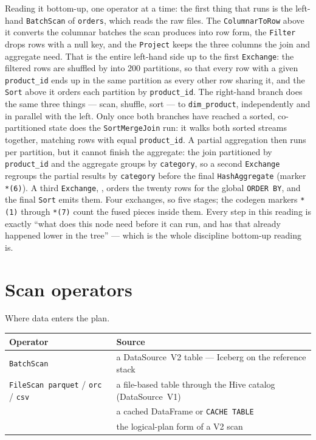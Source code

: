 Reading it bottom-up, one operator at a time: the first thing that runs is the
left-hand \texttt{BatchScan} of \texttt{orders}, which reads the raw files. The
\texttt{ColumnarToRow} above it converts the columnar batches the scan produces
into row form, the \texttt{Filter} drops rows with a null key, and the
\texttt{Project} keeps the three columns the join and aggregate need. That is the
entire left-hand side up to the first \texttt{Exchange}: the filtered rows are
shuffled by  into 200 partitions, so that every row
with a given \texttt{product\_id} ends up in the same partition as every other
row sharing it, and the \texttt{Sort} above it orders each partition by
\texttt{product\_id}. The right-hand branch does the same three things --- scan,
shuffle, sort --- to \texttt{dim\_product}, independently and in parallel with
the left. Only once both branches have reached a sorted, co-partitioned state
does the \texttt{SortMergeJoin} run: it walks both sorted streams together,
matching rows with equal \texttt{product\_id}. A partial aggregation then runs
per partition, but it cannot finish the aggregate: the join partitioned by
\texttt{product\_id} and the aggregate groups by \texttt{category}, so a second
\texttt{Exchange} regroups the partial results by \texttt{category} before the
final \texttt{HashAggregate} (marker \texttt{*(6)}). A third \texttt{Exchange},
, orders the twenty rows for the global
\texttt{ORDER BY}, and the final \texttt{Sort} emits them. Four exchanges, so five
stages; the codegen markers \texttt{*(1)} through \texttt{*(7)} count the
fused pieces inside them. Every step in this reading is exactly ``what does this
node need before it can run, and has that already happened lower in the tree'' ---
which is the whole discipline bottom-up reading is.

\section{Scan operators}
\label{sec:c-scan}

Where data enters the plan.

\begin{table}[H]
\centering\footnotesize
\renewcommand{\arraystretch}{1.15}
\begin{tabular}{@{}P{3.6cm}P{10.2cm}@{}}
\toprule
\textbf{Operator} & \textbf{Source} \\
\midrule
\texttt{BatchScan} & a DataSource~V2 table --- Iceberg on the reference stack \\
\texttt{FileScan parquet} / \texttt{orc} / \texttt{csv} & a file-based table through the Hive catalog (DataSource~V1) \\
 & a cached DataFrame or \texttt{CACHE TABLE} \\
 & the logical-plan form of a V2 scan \\
\bottomrule
\end{tabular}
\end{table}

